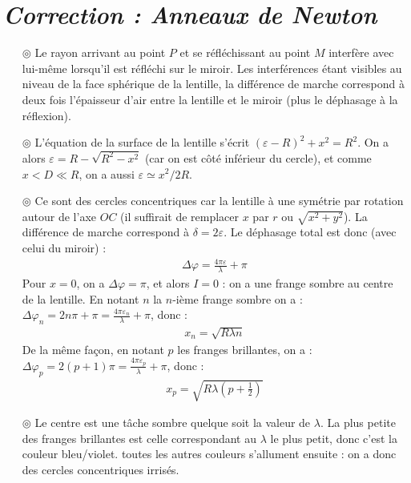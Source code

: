 \documentclass{report}
\begin{document}
\newpage

\section*{\textit{Correction : Anneaux de Newton}}

\begin{itemize}

	\item[$\circledcirc$] Le rayon arrivant au point $P$ et se réfléchissant au point $M$ interfère avec lui-même lorsqu'il est réfléchi sur le miroir. Les interférences étant visibles au niveau de la face sphérique de la lentille, la différence de marche correspond à deux fois l'épaisseur d'air entre la lentille et le miroir (plus le déphasage à la réflexion).
	
	\item[$\circledcirc$] L'équation de la surface de la lentille s'écrit $(\varepsilon-R)^2+x^2=R^2$. On a alors $\varepsilon=R-\sqrt{R^2-x^2}$ (car on est côté inférieur du cercle), et comme $x<D\ll R$, on a aussi $\varepsilon\simeq x^2/2R$.
	
	\item[$\circledcirc$] Ce sont des cercles concentriques car la lentille à une symétrie par rotation autour de l'axe $OC$ (il suffirait de remplacer $x$ par $r$ ou $\sqrt{x^2+y^2}$). La différence de marche correspond à $\delta=2\varepsilon$. Le déphasage total est donc (avec celui du miroir) :
	\begin{align*}
		\Delta \varphi = \frac{4\pi\varepsilon}{\lambda}+\pi
	\end{align*}
	Pour $x=0$, on a $\Delta \varphi = \pi$, et alors $I=0$ : on a une frange sombre au centre de la lentille. En notant $n$ la $n$-ième frange sombre on a : $\Delta\varphi_n=2n\pi+\pi=\frac{4\pi\varepsilon_n}{\lambda}+\pi$, donc :
	\begin{align*}
		x_n=\sqrt{R\lambda n}
	\end{align*}
	De la même façon, en notant $p$ les franges brillantes, on a :
	$\Delta\varphi_p=2(p+1)\pi=\frac{4\pi\varepsilon_p}{\lambda}+\pi$, donc :
	\begin{align*}
		x_p=\sqrt{R\lambda \left( p+\frac{1}{2}\right) }
	\end{align*}
	
	\item[$\circledcirc$] Le centre est une tâche sombre quelque soit la valeur de $\lambda$. La plus petite des franges brillantes est celle correspondant au $\lambda$ le plus petit, donc c'est la couleur bleu/violet. toutes les autres couleurs s'allument ensuite : on a donc des cercles concentriques irrisés. 

\end{itemize}
\end{document}
